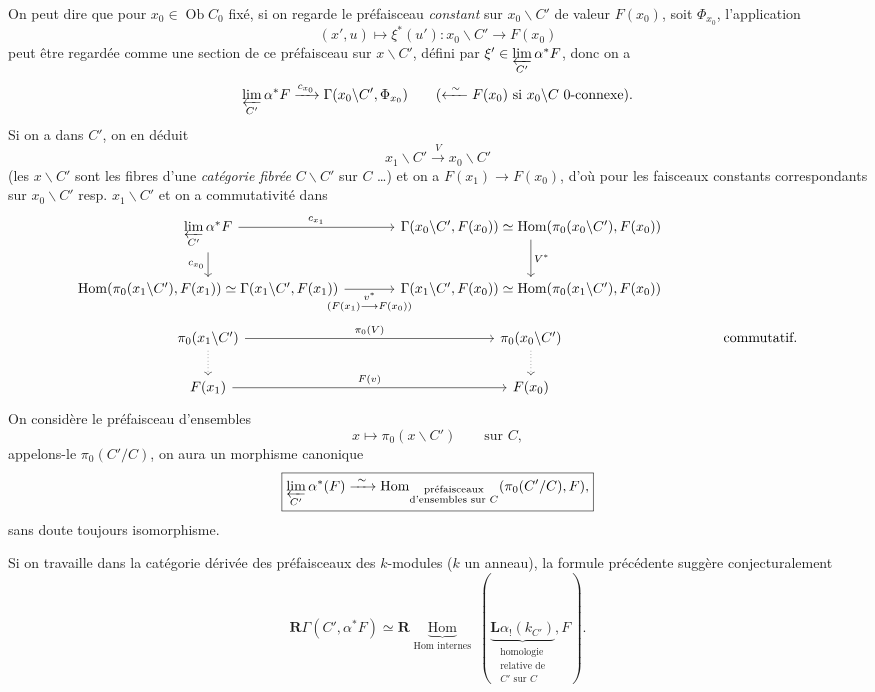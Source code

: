 \documentclass[11pt]{article}
\newcommand{\printedpage}[1]{\marginpar{\footnotesize p.~#1}}
\newcommand{\msp}[1]{\marginpar{\footnotesize [#1]}}
\begin{document}
On peut dire que pour $x_0 \in \operatorname{Ob} C_0$ fixé, si on regarde le préfaisceau \textit{constant} sur $x_0\backslash C'$ de valeur $F(x_0)$, soit $\Phi_{x_0}$, l'application
\[ (x',u) \longmapsto \xi^*(u') : x_0\backslash C' \longrightarrow F(x_0) \]
peut être regardée comme une section de ce préfaisceau sur $x\backslash C'$, défini par $\xi' \in \varprojlim\limits_{C'} \alpha^*F$, donc on a
\[ \varprojlim_{C'} \alpha^*F \xrightarrow{c_{x_0}} \Gamma(x_0\backslash C', \Phi_{x_0}) \qquad (\xleftarrow{\ \sim\ } F(x_0) \text{ si } x_0\backslash C \text{ 0-connexe}). \]
Si on a  dans $C'$, on en déduit
\[ x_1\backslash C' \xrightarrow{V} x_0\backslash C' \]
(les $x\backslash C'$ sont les fibres d'une \textit{catégorie fibrée} $C\backslash C'$ sur $C$ \dots) et on a $F(x_1) \longrightarrow F(x_0)$, d'où  pour les faisceaux constants correspondants sur $x_0\backslash C'$ resp. $x_1\backslash C'$
\printedpage{5}
\msp{page 7}
et on a commutativité dans
\[
\begin{tikzcd}[column sep=large]
\varprojlim\limits_{C'} \alpha^*F \arrow[r, "c_{x_1}"] \arrow[d, "c_{x_0}"'] & \Gamma(x_0\backslash C', F(x_0)) \simeq \operatorname{Hom}(\pi_0(x_0\backslash C'), F(x_0)) \arrow[d, "V^*"] & \\
\operatorname{Hom}(\pi_0(x_1\backslash C'), F(x_1)) \simeq \Gamma(x_1\backslash C', F(x_1)) \arrow[r, "\substack{v^*\\ (F(x_1) \longrightarrow F(x_0))}"'] & \Gamma(x_1\backslash C', F(x_0)) \simeq \operatorname{Hom}(\pi_0(x_1\backslash C'), F(x_0)) & \\
\pi_0(x_1\backslash C') \arrow[r, "\pi_0(V)"] \arrow[d, dotted] & \pi_0(x_0\backslash C') \arrow[d, dotted] & \text{commutatif.} \\
F(x_1) \arrow[r, "F(v)"] & F(x_0) &
\end{tikzcd}
\]
On considère le préfaisceau d'ensembles
\[ x \longmapsto \pi_0(x\backslash C') \qquad \text{sur } C, \]
appelons-le $\pi_0(C'/C)$, on aura un morphisme canonique
\[ \boxed{\varprojlim_{C'} \alpha^*(F) \xrightarrow{\ \sim\ } \operatorname{Hom}_{\substack{\text{préfaisceaux}\\ \text{d'ensembles sur $C$}}} (\pi_0(C'/C), F),} \]
sans doute toujours isomorphisme.

Si on travaille dans la catégorie dérivée des préfaisceaux des $k$-modules ($k$ un anneau), la formule précédente suggère conjecturalement
\[ \boxed{\mathbf{R}\Gamma(C', \alpha^*F) \simeq \mathbf{R}\underbrace{\operatorname{Hom}}_{\text{Hom internes}}\ (\underbrace{\mathbf{L}\alpha_!(k_{C'})}_{\substack{\text{homologie}\\ \text{relative de}\\ \text{$C'$ sur $C$}}}, F).} \]
\end{document}
